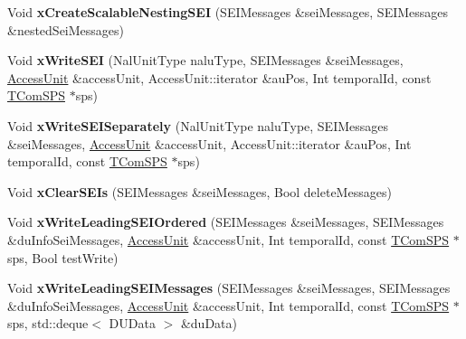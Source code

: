 \begin{DoxyCompactItemize}
\mbox{\label{class_t_enc_g_o_p_aa3d0493ee36e4f9f8680adb3cea1624a}} 
Void {\bfseries x\+Create\+Scalable\+Nesting\+S\+EI} (S\+E\+I\+Messages \&sei\+Messages, S\+E\+I\+Messages \&nested\+Sei\+Messages)
\item 
\mbox{\label{class_t_enc_g_o_p_aba43994b197f8c37a66703ab55041ef3}} 
Void {\bfseries x\+Write\+S\+EI} (Nal\+Unit\+Type nalu\+Type, S\+E\+I\+Messages \&sei\+Messages, \hyperlink{class_access_unit}{Access\+Unit} \&access\+Unit, Access\+Unit\+::iterator \&au\+Pos, Int temporal\+Id, const \hyperlink{class_t_com_s_p_s}{T\+Com\+S\+PS} $\ast$sps)
\item 
\mbox{\label{class_t_enc_g_o_p_a16277cae9151abed6640a67c2c222fa7}} 
Void {\bfseries x\+Write\+S\+E\+I\+Separately} (Nal\+Unit\+Type nalu\+Type, S\+E\+I\+Messages \&sei\+Messages, \hyperlink{class_access_unit}{Access\+Unit} \&access\+Unit, Access\+Unit\+::iterator \&au\+Pos, Int temporal\+Id, const \hyperlink{class_t_com_s_p_s}{T\+Com\+S\+PS} $\ast$sps)
\item 
\mbox{\label{class_t_enc_g_o_p_ad368fb597b641f2563556ebc69f9703c}} 
Void {\bfseries x\+Clear\+S\+E\+Is} (S\+E\+I\+Messages \&sei\+Messages, Bool delete\+Messages)
\item 
\mbox{\label{class_t_enc_g_o_p_a4aa5696c8a9bf1057b26c41310c4c262}} 
Void {\bfseries x\+Write\+Leading\+S\+E\+I\+Ordered} (S\+E\+I\+Messages \&sei\+Messages, S\+E\+I\+Messages \&du\+Info\+Sei\+Messages, \hyperlink{class_access_unit}{Access\+Unit} \&access\+Unit, Int temporal\+Id, const \hyperlink{class_t_com_s_p_s}{T\+Com\+S\+PS} $\ast$sps, Bool test\+Write)
\item 
\mbox{\label{class_t_enc_g_o_p_ac5bd2f7e7cf335475613ca3c414049ea}} 
Void {\bfseries x\+Write\+Leading\+S\+E\+I\+Messages} (S\+E\+I\+Messages \&sei\+Messages, S\+E\+I\+Messages \&du\+Info\+Sei\+Messages, \hyperlink{class_access_unit}{Access\+Unit} \&access\+Unit, Int temporal\+Id, const \hyperlink{class_t_com_s_p_s}{T\+Com\+S\+PS} $\ast$sps, std\+::deque$<$ D\+U\+Data $>$ \&du\+Data)
\item 
\mbox{\label{class_t_enc_g_o_p_a08ecf2c375a9136e13face65fade60a0}} 

\end{DoxyCompactItemize}
